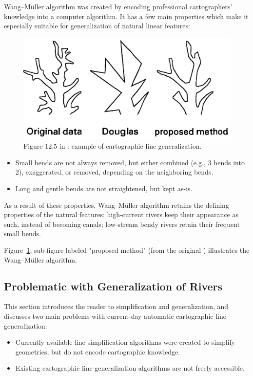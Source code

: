 \documentclass[a4paper]{article}
\newcommand{\titlecite}[1]{\citetitle{#1}\cite{#1}}
\newcommand{\WM}{Wang--M{\"u}ller}
\begin{document}
{\WM} algorithm was created by encoding professional cartographers' knowledge
into a computer algorithm. It has a few main properties which make it
especially suitable for generalization of natural linear features:

\begin{figure}[b]
    \centering
    \includegraphics[width=.8\textwidth]{wang125}
    \caption{Figure 12.5 in \cite{wang1998line}: example of cartographic line
    generalization.}
    \label{fig:wang125}
\end{figure}

\begin{itemize}
    \item Small bends are not always removed, but either combined (e.g.,
        3 bends into 2), exaggerated, or removed, depending on the neighboring
        bends.
    \item Long and gentle bends are not straightened, but kept as-is.
\end{itemize}

As a result of these properties, {\WM} algorithm retains the defining
properties of the natural features: high-current rivers keep their appearance
as such, instead of becoming canals; low-stream bendy rivers retain their
frequent small bends.

Figure~\ref{fig:wang125}, sub-figure labeled "proposed method" (from the
original \titlecite{wang1998line}) illustrates the {\WM} algorithm.

\subsection{Problematic with Generalization of Rivers}

This section introduces the reader to simplification and generalization, and
discusses two main problems with current-day automatic cartographic line
generalization:

\begin{itemize}
    \item Currently available line simplification algorithms were created
        to simplify geometries, but do not encode cartographic knowledge.

    \item Existing cartographic line generalization algorithms are not freely
        accessible.
\end{itemize}
\end{document}

